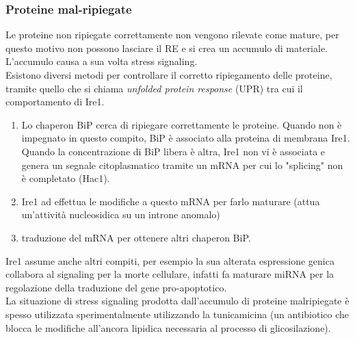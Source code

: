         \subsubsection{Proteine mal-ripiegate}
            Le proteine non ripiegate correttamente non vengono rilevate come mature, per questo motivo non possono lasciare il RE e si crea un accumulo di materiale. L'accumulo causa a sua volta stress signaling.\\
            Esistono diversi metodi per controllare il corretto ripiegamento delle proteine, tramite quello che si chiama \textit{unfolded protein response} (UPR) tra cui il comportamento di Ire1.
            \begin{enumerate}
                \item Lo chaperon BiP cerca di ripiegare correttamente le proteine. Quando non è impegnato in questo compito, BiP è associato alla proteina di membrana Ire1.
                Quando la concentrazione di BiP libera è altra, Ire1 non vi è associata e genera un segnale citoplasmatico tramite un mRNA per cui lo "splicing" non è completato (Hac1).
                \item Ire1 ad effettua le modifiche a questo mRNA per farlo maturare (attua un'attività nucleosidica su un introne anomalo)
                \item traduzione del mRNA per ottenere altri chaperon BiP.
            \end{enumerate}
            Ire1 assume anche altri compiti, per esempio la sua alterata espressione genica collabora al signaling per la morte cellulare, infatti fa maturare miRNA per la regolazione della traduzione del gene pro-apoptotico.\\
            La situazione di stress signaling prodotta dall'accumulo di proteine malripiegate è spesso utilizzata sperimentalmente utilizzando la tunicamicina (un antibiotico che blocca le modifiche all'ancora lipidica necessaria al processo di glicosilazione).\\
            
